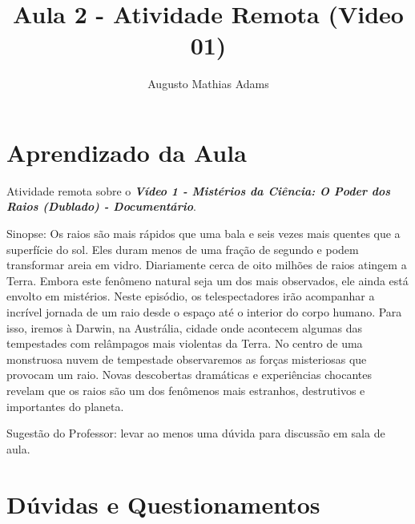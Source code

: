 \documentclass[a4paper, 12pt, onecolumn,singlespacing]{article}
\title{Aula 2 - Atividade Remota (Video 01)}
\author[1]{Augusto Mathias Adams}
\affil[1]{augusto.adams@ufpr.br}
\begin{document}
	
	\maketitle
	
	\section{Aprendizado da Aula}
	
	Atividade remota sobre o \textbf{\textit{Vídeo 1 - Mistérios da Ciência: O Poder dos Raios (Dublado) - Documentário}}.
	
	Sinopse: Os raios são mais rápidos que uma bala e seis vezes mais quentes que a superfície do sol. Eles duram menos de uma fração de segundo e podem transformar areia em vidro. Diariamente cerca de oito milhões de raios atingem a Terra. Embora este fenômeno natural seja um dos mais observados, ele ainda está envolto em mistérios. Neste episódio, os telespectadores irão acompanhar a incrível jornada de um raio desde o espaço até o interior do corpo humano. Para isso, iremos à Darwin, na Austrália, cidade onde acontecem algumas das tempestades com relâmpagos mais violentas da Terra. No centro de uma monstruosa nuvem de tempestade observaremos as forças misteriosas que provocam um raio. Novas descobertas dramáticas e experiências chocantes revelam que os raios são um dos fenômenos mais estranhos, destrutivos e importantes do planeta.
	
	Sugestão do Professor: levar ao menos uma dúvida para discussão em sala de aula.
	
	\section{Dúvidas e Questionamentos}
	
\end{document}
